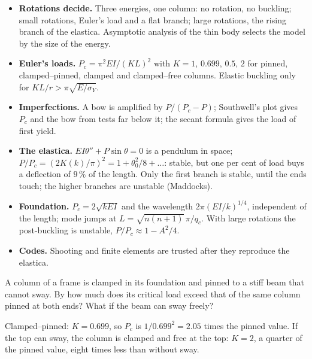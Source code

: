 \begin{gbox*}
\begin{itemize}
  \item \textbf{Rotations decide.} Three energies, one column: no rotation, no buckling; small
        rotations, Euler's load and a flat branch; large rotations, the rising branch of the
        elastica. Asymptotic analysis of the thin body selects the model by the size of the
        energy.
  \item \textbf{Euler's loads.} $P_c = \pi^2EI/(KL)^2$ with $K = 1$, $0.699$, $0.5$, $2$ for
        pinned, clamped--pinned, clamped and clamped--free columns. Elastic buckling only for
        $KL/r > \pi\sqrt{E/\sigma_Y}$.
  \item \textbf{Imperfections.} A bow is amplified by $P/(P_c - P)$; Southwell's plot gives $P_c$
        and the bow from tests far below it; the secant formula gives the load of first yield.
  \item \textbf{The elastica.} $EI\theta'' + P\sin\theta = 0$ is a pendulum in space;
        $P/P_c = (2K(k)/\pi)^2 = 1 + \theta_0^2/8 + \dots$: stable, but one per cent of load buys a
        deflection of $9\,\%$ of the length. Only the first branch is stable, until the ends touch; the
        higher branches are unstable (Maddocks).
  \item \textbf{Foundation.} $P_c = 2\sqrt{kEI}$ and the wavelength $2\pi(EI/k)^{1/4}$, independent
        of the length; mode jumps at $L = \sqrt{n(n+1)}\,\pi/q_c$. With large rotations the
        post-buckling is unstable, $P/P_c \approx 1 - A^2/4$.
  \item \textbf{Codes.} Shooting and finite elements are trusted after they reproduce the elastica.
\end{itemize}
\end{gbox*}

\label{sec:rd-exo}

\label{exo:rd-efflength}
%
A column of a frame is clamped in its foundation and pinned to a stiff beam that cannot sway.
By how much does its critical load exceed that of the same column pinned at both ends? What if
the beam can sway freely?
\begin{solution}
Clamped--pinned: $K = 0.699$, so $P_c$ is $1/0.699^2 = 2.05$ times the pinned value. If the top
can sway, the column is clamped and free at the top: $K = 2$, a quarter of the pinned value,
eight times less than without sway.
\end{solution}

